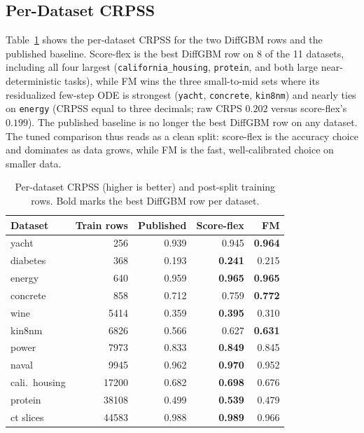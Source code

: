\documentclass{article}
\begin{document}
\subsection{Per-Dataset CRPSS}\label{sec:perdata}
Table~\ref{tab:per-dataset} shows the per-dataset CRPSS for the two DiffGBM rows and the published baseline. Score-flex is the best DiffGBM row on 8 of the 11 datasets, including all four largest (\texttt{california\_housing}, \texttt{protein}, and both large near-deterministic tasks), while FM wins the three small-to-mid sets where its residualized few-step ODE is strongest (\texttt{yacht}, \texttt{concrete}, \texttt{kin8nm}) and nearly ties on \texttt{energy} (CRPSS equal to three decimals; raw CRPS $0.202$ versus score-flex's $0.199$). The published baseline is no longer the best DiffGBM row on any dataset. The tuned comparison thus reads as a clean split: score-flex is the accuracy choice and dominates as data grows, while FM is the fast, well-calibrated choice on smaller data.

\begin{table}[!t]
  \centering
  \caption{Per-dataset CRPSS (higher is better) and post-split training rows. Bold marks the best DiffGBM row per dataset.}\label{tab:per-dataset}
  \footnotesize
  \begin{tabular}{lrrrr}
    \toprule
    Dataset & Train rows & Published & Score-flex & FM \\
    \midrule
    yacht & 256 & 0.939 & 0.945 & \textbf{0.964} \\
    diabetes & 368 & 0.193 & \textbf{0.241} & 0.215 \\
    energy & 640 & 0.959 & \textbf{0.965} & \textbf{0.965} \\
    concrete & 858 & 0.712 & 0.759 & \textbf{0.772} \\
    wine & 5414 & 0.359 & \textbf{0.395} & 0.310 \\
    kin8nm & 6826 & 0.566 & 0.627 & \textbf{0.631} \\
    power & 7973 & 0.833 & \textbf{0.849} & 0.845 \\
    naval & 9945 & 0.962 & \textbf{0.970} & 0.952 \\
    cali.\ housing & 17200 & 0.682 & \textbf{0.698} & 0.676 \\
    protein & 38108 & 0.499 & \textbf{0.539} & 0.479 \\
    ct slices & 44583 & 0.988 & \textbf{0.989} & 0.966 \\
    \bottomrule
  \end{tabular}
\end{table}
\end{document}
